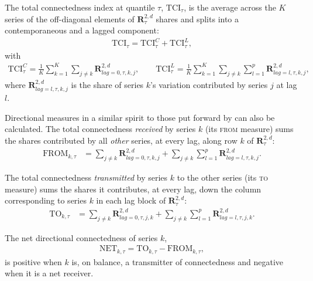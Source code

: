 \documentclass{article}
\begin{document}
The total connectedness index at quantile $\tau$, $\mathrm{TCI}_{\tau}$, is the average across the $K$ series of the off-diagonal elements of $\bm{R}_{\tau}^{2,d}$ shares and splits into a contemporaneous and a lagged
component:
\begin{align}
\mathrm{TCI}_{\tau} = \mathrm{TCI}_{\tau}^{C} + \mathrm{TCI}_{\tau}^{L},
\end{align}
with
\begin{align}
\mathrm{TCI}_{\tau}^{C}
  = \frac{1}{K}\sum_{k=1}^{K}\sum_{j\neq k}\bm{R}_{lag=0,\tau,k,j}^{2,d},
\qquad
\mathrm{TCI}_{\tau}^{L}
  = \frac{1}{K}\sum_{k=1}^{K}\sum_{j\neq k}\sum_{l=1}^{p}
    \bm{R}_{lag=l,\tau,k,j}^{2,d},
\end{align}
where $\bm{R}_{lag=l,\tau,k,j}^{2,d}$ is the share of series $k$'s variation contributed by
series $j$ at lag $l$. %

Directional measures in a similar spirit to those put forward by \textcite{dieboldyilmaz2012}
can also be calculated. The
total connectedness \emph{received} by series $k$ (its \textsc{from} measure) sums the shares
contributed by all \emph{other} series, at every lag, along row $k$ of $\bm{R}_{\tau}^{2,d}$:
\begin{align}
\mathrm{FROM}_{k,\tau}
  &= \sum_{j\neq k}\bm{R}_{lag=0,\tau,k,j}^{2,d}
   + \sum_{j\neq k}\sum_{l=1}^{p}\bm{R}_{lag=l,\tau,k,j}^{2,d}.
\end{align}

The total connectedness \emph{transmitted} by series $k$ to the other series (its \textsc{to}
measure) sums the shares it contributes, at every lag, down the column corresponding to series $k$ in each lag block of $\bm{R}_{\tau}^{2,d}$:
\begin{align}
\mathrm{TO}_{k,\tau}
  &= \sum_{j\neq k}\bm{R}_{lag=0,\tau,j,k}^{2,d}
   + \sum_{j\neq k}\sum_{l=1}^{p}\bm{R}_{lag=l,\tau,j,k}^{2,d}.
\end{align}

The net directional connectedness of series $k$,
\begin{align}
\mathrm{NET}_{k,\tau} = \mathrm{TO}_{k,\tau} - \mathrm{FROM}_{k,\tau},
\end{align}
is positive when $k$ is, on balance, a transmitter of connectedness and
negative when it is a net receiver.  
\end{document}
